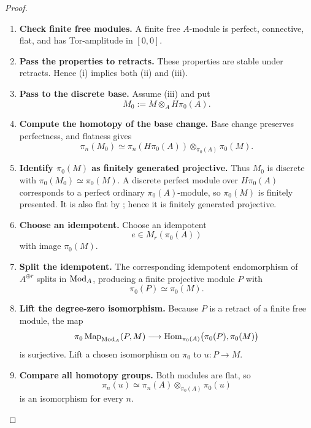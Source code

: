 \begin{proof}
\leavevmode
\begin{enumerate}[label=\textup{(\arabic*)}]
    \item \textbf{Check finite free modules.}
    A finite free \(A\)-module is perfect, connective, flat, and has
    Tor-amplitude in \([0,0]\).

    \item \textbf{Pass the properties to retracts.}
    These properties are stable under retracts.
    Hence \textup{(i)} implies both \textup{(ii)} and \textup{(iii)}.

    \item \textbf{Pass to the discrete base.}
    Assume \textup{(iii)} and put
    \[
        M_0:=M\otimes_AH\pi_0(A).
    \]

    \item \textbf{Compute the homotopy of the base change.}
    Base change preserves perfectness, and flatness gives
    \[
        \pi_n(M_0)
        \simeq
        \pi_n(H\pi_0(A))\otimes_{\pi_0(A)}\pi_0(M).
    \]

    \item \textbf{Identify \(\pi_0(M)\) as finitely generated projective.}
    Thus \(M_0\) is discrete with \(\pi_0(M_0)\simeq\pi_0(M)\). A discrete
    perfect module over \(H\pi_0(A)\) corresponds to a perfect ordinary
    \(\pi_0(A)\)-module, so \(\pi_0(M)\) is finitely presented. It is also
    flat by ; hence it is finitely generated
    projective.

    \item \textbf{Choose an idempotent.}
    Choose an idempotent
    \[
        e\in M_r(\pi_0(A))
    \]
    with image \(\pi_0(M)\).

    \item \textbf{Split the idempotent.}
    The corresponding idempotent endomorphism of
    \(A^{\oplus r}\) splits in \(\operatorname{Mod}_A\), producing a finite projective
    module \(P\) with
    \[
        \pi_0(P)\simeq\pi_0(M).
    \]

    \item \textbf{Lift the degree-zero isomorphism.}
    Because \(P\) is a retract of a finite free module, the map
    \[
        \pi_0\operatorname{Map}_{\operatorname{Mod}_A}(P,M)
        \longrightarrow
        \operatorname{Hom}_{\pi_0(A)}\bigl(\pi_0(P),\pi_0(M)\bigr)
    \]
    is surjective. Lift a chosen isomorphism on \(\pi_0\) to
    \(u:P\to M\).

    \item \textbf{Compare all homotopy groups.}
    Both modules are flat, so
    \[
        \pi_n(u)
        \simeq
        \pi_n(A)\otimes_{\pi_0(A)}\pi_0(u)
    \]
    is an isomorphism for every \(n\).


\end{enumerate}
\end{proof}

